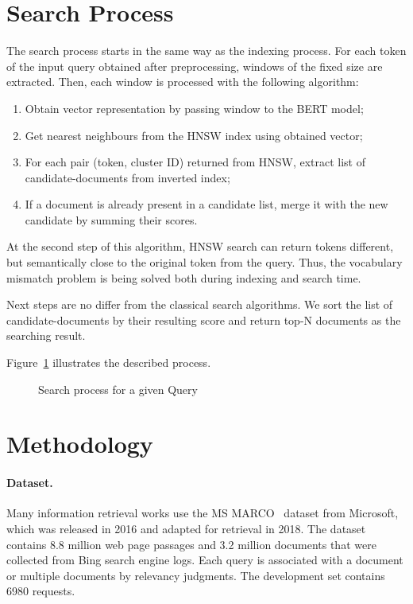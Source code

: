 \documentclass[
    twocolumn,
]{template/ceurart}
\begin{document}
    \section{Search Process}
    The search process starts in the same way as the indexing process.
    For each token of the input query obtained after preprocessing, windows of the fixed size are extracted.
    Then, each window is processed with the following algorithm:
    \begin{enumerate}
        \item Obtain vector representation by passing window to the BERT model;
        \item Get nearest neighbours from the HNSW index using obtained vector;
        \item For each pair (token, cluster ID) returned from HNSW, extract list of candidate-documents from inverted index;
        \item If a document is already present in a candidate list, merge it with the new candidate by summing their scores.
    \end{enumerate}

    At the second step of this algorithm, HNSW search can return tokens different,
    but semantically close to the original token from the query.
    Thus, the vocabulary mismatch problem is being solved both during indexing and search time.

    Next steps are no differ from the classical search algorithms.
    We sort the list of candidate-documents by their resulting score and return top-N documents as the searching result.

    Figure~\ref{fig:searchProcess} illustrates the described process.
    \begin{figure}
        \centering
        
        \caption{Search process for a given Query}
        \label{fig:searchProcess}
    \end{figure}


    \section{Methodology}\label{sec:methodology}

    \paragraph{Dataset.}
    Many information retrieval works use the MS MARCO~\cite{msMarco} dataset from Microsoft,
    which was released in 2016 and adapted for retrieval in 2018.
    The dataset contains 8.8 million web page passages and 3.2 million documents that were collected
    from Bing search engine logs.
    Each query is associated with a document or multiple documents by relevancy judgments.
    The development set contains 6980 requests.
\end{document}
